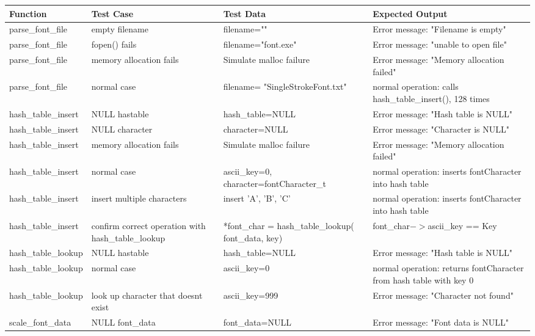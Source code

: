 
\begin{longtable}{|>{\raggedright\arraybackslash}m{}|>{\raggedright\arraybackslash}m{}|>{\raggedright\arraybackslash}m{}|>{\raggedright\arraybackslash}m{}|}
    \hline
    \textbf{Function} & \textbf{Test Case} & \textbf{Test Data} & \textbf{Expected Output} \\ \hline
    parse\_font\_file & empty filename & filename="" & Error message: "Filename is empty" \\ \hline
    parse\_font\_file & fopen() fails & filename="font.exe" & Error message: "unable to open file" \\ \hline
    parse\_font\_file & memory allocation fails & Simulate malloc failure  &  Error message: "Memory allocation failed" \\ \hline
    parse\_font\_file & normal case & filename= "SingleStrokeFont.txt" &  normal operation: calls hash\_table\_insert(), 128 times \\ \hline
    hash\_table\_insert & NULL hastable & hash\_table=NULL & Error message: "Hash table is NULL" \\ \hline
    hash\_table\_insert & NULL character & character=NULL & Error message: "Character is NULL" \\ \hline
    hash\_table\_insert & memory allocation fails & Simulate malloc failure  &  Error message: "Memory allocation failed" \\ \hline
    hash\_table\_insert & normal case & ascii\_key=0, character=fontCharacter\_t &  normal operation: inserts fontCharacter into hash table \\ \hline
    hash\_table\_insert & insert multiple characters & insert 'A', 'B', 'C' &  normal operation: inserts fontCharacter into hash table \\ \hline
    hash\_table\_insert & confirm correct operation with hash\_table\_lookup & *font\_char = hash\_table\_lookup( font\_data, key) & font\_char$->$ascii\_key == Key \\ \hline
    hash\_table\_lookup & NULL hastable & hash\_table=NULL & Error message: "Hash table is NULL" \\ \hline
    hash\_table\_lookup & normal case & ascii\_key=0 &  normal operation: returns fontCharacter from hash table with key 0\\ \hline
    hash\_table\_lookup & look up character that doesnt exist & ascii\_key=999 &  Error message: "Character not found" \\ \hline
    scale\_font\_data & NULL font\_data & font\_data=NULL & Error message: "Font data is NULL" \\ \hline

\end{longtable}
